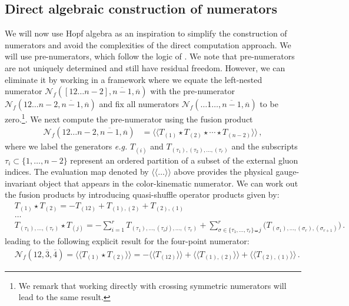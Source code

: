 \documentclass[a4paper,12pt]{article}
\def\sc#1{\overline{#1}}
\def\nn{\nonumber}
\newcommand{\npre}{\mathcal{N}}
\begin{document}
\subsection{Direct algebraic construction of numerators}
We will now use Hopf algebra as an inspiration to simplify the construction of numerators and avoid the complexities of the direct computation approach. We will use pre-numerators, which follow the logic of \cite{Chen:2021chy}. 
We note that pre-numerators are not uniquely determined and still have residual freedom. However, we can eliminate it by working in a framework where we equate the left-nested numerator $\npre_{\!f}([12\ldots n\!-\!2], \sc{n{-}1},\sc{n})$ with the pre-numerator $\npre_{\!f}(12\ldots n\!-\!2, \sc{n{-}1},\sc{n})$ and fix all numerators $\npre_{\!f}(\ldots 1 \ldots, \sc{n{-}1},\sc n)$ to be zero.\footnote{\footnotesize{We remark that working directly with crossing symmetric numerators will lead to the same result.}}. We next compute the pre-numerator using the fusion product
%
\begin{align}
    \npre_{\!f}(12\ldots n\!-\!2,\sc {n\!-\!1}, \sc n)&=\langle\!\langle T_{(1)}\star T_{(2)}\star \cdots \star T_{(n\!-\!2)}\rangle\!\rangle \,  ,
\end{align}
%
where we label the generators {\it {\it e.g.}} $T_{(i)}$ and $T_{(\tau_1),(\tau_2),\ldots, (\tau_r)}$ and the subscripts $\tau_{i} \subset\{1, \ldots, n\!-\!2\}$ represent an ordered partition of a subset of the external gluon indices. The evaluation map denoted by $\langle\!\langle \ldots \rangle\!\rangle$ above provides the physical gauge-invariant object that appears in the color-kinematic numerator. We can work out the fusion products by introducing quasi-shuffle operator products given by:
%
\begin{align}\label{eq:fusion}
    &T_{(1)}\star T_{(2)}=-T_{(12)}+T_{(1),(2)}+T_{(2),(1)}\nn \\
    & \ldots\nn \\
    &T_{(\tau_1),\ldots, (\tau_r)}\star T_{(j)}=-\sum_{i=1}^{r}T_{(\tau_1),\ldots,(\tau_i j),\ldots, (\tau_r)}+\sum_{\sigma\in \{\tau_1,\ldots,\tau_r\}\shuffle j}^r \Big(T_{(\sigma_1),\ldots, (\sigma_r),(\sigma_{r+1})}\Big) \, .
\end{align}
%
leading to the following explicit result for the four-point numerator:
%
\begin{align}
    &\npre_{\!f}(12,\sc{3},\sc 4)=\langle\!\langle T_{(1)}\star T_{(2)}\rangle\!\rangle=-\langle\!\langle T_{(12)}\rangle\!\rangle +\langle\!\langle T_{(1),(2)}\rangle\!\rangle+\langle\!\langle T_{(2),(1)}\rangle\!\rangle \, .
\end{align}
\end{document}
